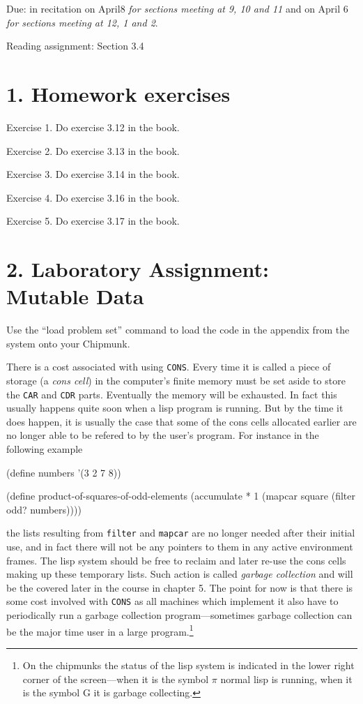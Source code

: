 \vpar
Due: in recitation on April8 {\it for sections meeting at 9, 10 and
11} and on April 6 {\it for sections meeting at 12, 1 and 2}.


\vpar
Reading assignment: Section 3.4


\chapter{1. Homework exercises}


\vpar
Exercise 1. Do exercise 3.12 in the book.

\vpar
Exercise 2. Do exercise 3.13 in the book.

\vpar
Exercise 3. Do exercise 3.14 in the book.

\vpar
Exercise 4. Do exercise 3.16 in the book.

\vpar
Exercise 5. Do exercise 3.17 in the book.


\chapter{2. Laboratory Assignment: Mutable Data}

Use the ``load problem set'' command to load the code in the appendix
from the system onto your Chipmunk.

There is a cost associated with using {\tt CONS}.  Every time it is
called a piece of storage (a {\it cons cell}) in the computer's finite
memory must be set aside to store the {\tt CAR} and {\tt CDR} parts. 
Eventually the memory will be exhausted.  In fact this usually happens
quite soon when a lisp program is running.  But by the time it does
happen, it is usually the case that some of the cons cells allocated
earlier are no longer able to be refered to by the user's program.  For
instance in the following example

\beginlisp
(define numbers '(3 2 7 8))

(define product-of-squares-of-odd-elements
  (accumulate *
              1
              (mapcar square
                      (filter odd? numbers))))
\endlisp

\noindent the lists resulting from {\tt filter} and {\tt mapcar} are
no longer needed after their initial use, and in fact there will not
be any pointers to them in any active environment frames.  The lisp
system should be free to reclaim and later re-use the cons cells making
up these temporary lists.  Such action is called {\it garbage
collection} and will be the covered later in the course in chapter 5. 
The point for now is that there is some cost involved with {\tt CONS} as
all machines which implement it also have to periodically run a garbage
collection program---sometimes garbage collection can be the major time
user in a large program.\footnote*{On the chipmunks the status of the
lisp system is indicated in the lower right corner of the screen---when
it is the symbol $\pi$ normal lisp is running, when it is the symbol G
it is garbage collecting.}

